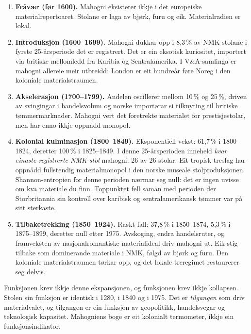 \documentclass[10pt, a4paper, twocolumn]{article}
\begin{document}
\begin{enumerate}
  \item \textbf{Fråvær (før 1600).} Mahogni eksisterer ikkje i det europeiske materialrepertoaret. Stolane er laga av bjørk, furu og eik. Materialradien er lokal.

  \item \textbf{Introduksjon (1600--1699).} Mahogni dukkar opp i 8,3\,\% av NMK-stolane i fyrste 25-årsperiode det er registrert. Det er ein eksotisk kuriositet, importert via britiske mellomledd frå Karibia og Sentralamerika. I V\&A-samlinga er mahogni allereie meir utbreidd: London er eit hundreår føre Noreg i den koloniale materialstraumen.

  \item \textbf{Akselerasjon (1700--1799).} Andelen oscillerer mellom 10\,\% og 25\,\%, driven av svingingar i handelsvolum og norske importørar si tilknyting til britiske tømmermarknader. Mahogni vert det foretrekte materialet for prestisjestolar, men har enno ikkje oppnådd monopol.

  \item \textbf{Kolonial kulminasjon (1800--1849).} Eksponentiell vekst: 61,7\,\% i 1800--1824, deretter 100\,\% i 1825--1849. I denne 25-årsperioden inneheld \emph{kvar einaste registrerte NMK-stol} mahogni: 26 av 26 stolar. Eit tropisk treslag har oppnådd fullstendig materialmonopol i den norske museale stolproduksjonen. Shannon-entropien for denne perioden nærmar seg null: det er ingen uvisse om kva materiale du finn. Toppunktet fell saman med perioden der Storbritannia sin kontroll over karibisk og sentralamerikansk tømmer var på sitt sterkaste.

  \item \textbf{Tilbaketrekking (1850--1924).} Raskt fall: 37,8\,\% i 1850--1874, 5,3\,\% i 1875--1899, deretter null etter 1975. Avskoging, endra handelsruter, og framveksten av nasjonalromantiske materialideal driv mahogni ut. Eik stig tilbake som dominerande materiale i NMK, følgd av bjørk og furu. Den koloniale materialstraumen tørkar opp, og det lokale treregimet restaurerer seg delvis.
\end{enumerate}

Funksjonen krev ikkje denne ekspansjonen, og funksjonen krev ikkje kollapsen. Stolen sin funksjon er identisk i 1280, i 1840 og i 1975. Det er \emph{tilgangen} som driv materialvalet, og tilgangen er ein funksjon av geopolitikk, handelsvegar og teknologisk kapasitet. Mahogniens boge er eit kolonialt termometer, ikkje ein funksjonsindikator.
\end{document}

